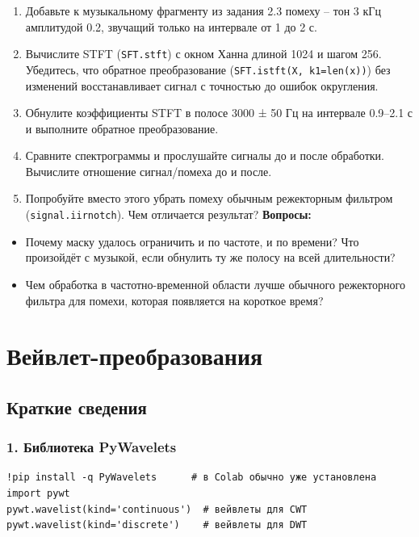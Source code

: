 \documentclass[12pt,a4paper,openany]{book}
\providecommand{\tightlist}{\setlength{\itemsep}{0pt}\setlength{\parskip}{0pt}}
\begin{document}
\begin{enumerate}
\def\labelenumi{\arabic{enumi}.}
\tightlist
\item
  Добавьте к музыкальному фрагменту из задания 2.3 помеху -- тон 3 кГц амплитудой 0.2, звучащий только на интервале от 1 до 2 с.
\item
  Вычислите STFT (\texttt{SFT.\allowbreak{}stft}) с окном Ханна длиной 1024 и шагом 256. Убедитесь, что обратное преобразование (\texttt{SFT.\allowbreak{}istft(\allowbreak{}X,\allowbreak{}\ k1=\allowbreak{}len(\allowbreak{}x))}) без изменений восстанавливает сигнал с точностью до ошибок округления.
\item
  Обнулите коэффициенты STFT в полосе 3000 ± 50 Гц на интервале 0.9--2.1 с и выполните обратное преобразование.
\item
  Сравните спектрограммы и прослушайте сигналы до и после обработки. Вычислите отношение сигнал/помеха до и после.
\item
  Попробуйте вместо этого убрать помеху обычным режекторным фильтром (\texttt{signal.\allowbreak{}iirnotch}). Чем отличается результат?
  \textbf{Вопросы:}
\end{enumerate}

\begin{itemize}
\tightlist
\item
  Почему маску удалось ограничить и по частоте, и по времени? Что произойдёт с музыкой, если обнулить ту же полосу на всей длительности?
\item
  Чем обработка в частотно-временной области лучше обычного режекторного фильтра для помехи, которая появляется на короткое время?
\end{itemize}


\chapter{Вейвлет-преобразования}

\section*{Краткие сведения}

\subsection*{1. Библиотека PyWavelets}

\begin{Verbatim}[fontsize=\small, breaklines, breakanywhere]
!pip install -q PyWavelets      # в Colab обычно уже установлена
import pywt
pywt.wavelist(kind='continuous')  # вейвлеты для CWT
pywt.wavelist(kind='discrete')    # вейвлеты для DWT
\end{Verbatim}
\end{document}
